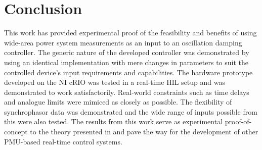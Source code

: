 \documentclass[journal]{IEEEtran}
\begin{document}
\section{Conclusion}\label{Conclusion}
This work has provided experimental proof of the feasibility and benefits of using wide-area power system measurements as an input to an oscillation damping controller. The generic nature of the developed controller was demonstrated by using an identical implementation with mere changes in parameters to suit the controlled device's input requirements and capabilities. The hardware prototype developed on the NI cRIO was tested in a real-time HIL setup and was demonstrated to work satisfactorily. Real-world constraints such as time delays and analogue limits were mimiced as closely as possible. The flexibility of synchrophasor data was demonstrated and the wide range of inputs possible from this were also tested. The results from this work serve as experimental proof-of-concept to the theory presented in \cite{Yuwa} and pave the way for the development of other PMU-based real-time control systems.


%
\end{document}
